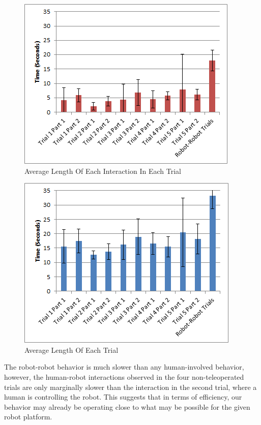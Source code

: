 \documentclass[letterpaper, 10 pt, conference]{ieeeconf}  %
\begin{document}
       \begin{figure}
      \centering
      \includegraphics{interaction_length.png}
      \caption{Average Length Of Each Interaction In Each Trial}
      \label{fig:Interaction}
   \end{figure}


     \begin{figure}
      \centering
      \includegraphics{trial_length.png}
      \caption{Average Length Of Each Trial}
      \label{fig:Trial}
   \end{figure}

The robot-robot behavior is much slower than any human-involved behavior, however, the human-robot interactions observed in the four non-teleoperated trials are only marginally slower than the interaction in the second trial, where a human is controlling the robot. This suggests that in terms of efficiency, our behavior may already be operating close to what may be possible for the given robot platform. %
\end{document}
